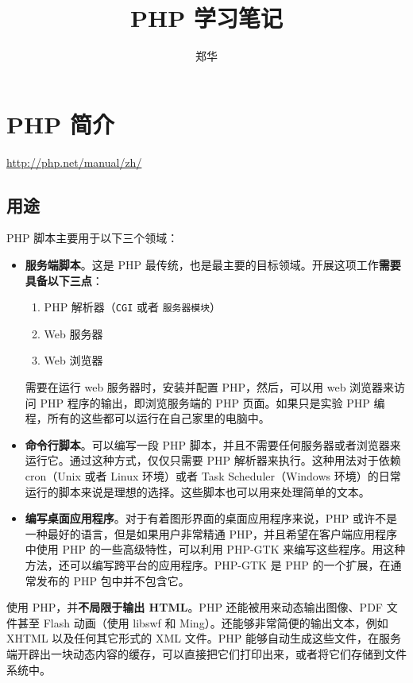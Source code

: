 \documentclass[UTF8,a4paper,12pt]{ctexbook}
\author{\kaishu 郑华}
\title{\heiti PHP 学习笔记}
\begin{document}
 	\maketitle
 	\tableofcontents

\chapter{PHP 简介}	
 	\url{http://php.net/manual/zh/}
 	\section{用途}
 		PHP 脚本主要用于以下三个领域：
 		
 		\begin{itemize}
 			\item \textbf{服务端脚本}。这是 PHP 最传统，也是最主要的目标领域。开展这项工作\textbf{需要具备以下三点}：
 				\begin{enumerate}
 					\item PHP 解析器（\verb|CGI| 或者 \verb|服务器模块|）
 					\item Web 服务器
 					\item Web 浏览器
 				\end{enumerate}
 			需要在运行 web 服务器时，安装并配置 PHP，然后，可以用 web 浏览器来访问 PHP 程序的输出，即浏览服务端的 PHP 页面。如果只是实验 PHP 编程，所有的这些都可以运行在自己家里的电脑中。
 			
 			\item \textbf{命令行脚本}。可以编写一段 PHP 脚本，并且不需要任何服务器或者浏览器来运行它。通过这种方式，仅仅只需要 PHP 解析器来执行。这种用法对于依赖 cron（Unix 或者 Linux 环境）或者 Task Scheduler（Windows 环境）的日常运行的脚本来说是理想的选择。这些脚本也可以用来处理简单的文本。
 			
 			\item \textbf{编写桌面应用程序}。对于有着图形界面的桌面应用程序来说，PHP 或许不是一种最好的语言，但是如果用户非常精通 PHP，并且希望在客户端应用程序中使用 PHP 的一些高级特性，可以利用 PHP-GTK 来编写这些程序。用这种方法，还可以编写跨平台的应用程序。PHP-GTK 是 PHP 的一个扩展，在通常发布的 PHP 包中并不包含它。
 		\end{itemize}
 		
 		
 		使用 PHP，并\textbf{不局限于输出 HTML}。PHP 还能被用来动态输出图像、PDF 文件甚至 Flash 动画（使用 libswf 和 Ming）。还能够非常简便的输出文本，例如 XHTML 以及任何其它形式的 XML 文件。PHP 能够自动生成这些文件，在服务端开辟出一块动态内容的缓存，可以直接把它们打印出来，或者将它们存储到文件系统中。
 		
\end{document}
